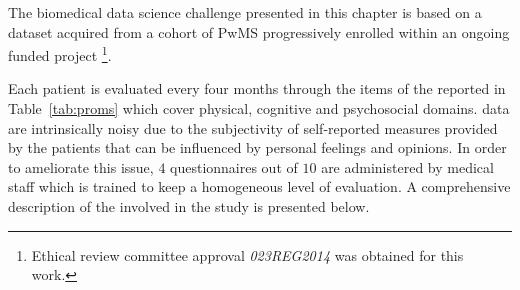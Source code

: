 

The biomedical data science challenge presented in this chapter is based on a \PCO dataset acquired from a cohort of PwMS progressively enrolled within an ongoing funded project \footnote{ Ethical review committee approval \textit{023REG2014} was obtained for this work.}.

Each patient is evaluated every four months through the items of the \PCOs reported in Table~\ref{tab:proms} which cover physical, cognitive and psychosocial domains.
\PCO data are intrinsically noisy due to the subjectivity of self-reported measures provided by the patients that can be influenced by personal feelings and opinions. In order to ameliorate this issue, $4$ questionnaires out of $10$ are administered by medical staff which is trained to keep a homogeneous level of evaluation.
A comprehensive description of the \PCOs involved in the study is presented below.

